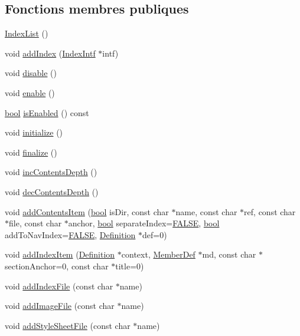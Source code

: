 \subsection*{Fonctions membres publiques}
\begin{DoxyCompactItemize}
\item 
\hyperlink{class_index_list_a9d525f0a264b6aba4f8acf2d513a31ea}{Index\+List} ()
\item 
void \hyperlink{class_index_list_a8120913e328f96fec6e5b2070902f4e7}{add\+Index} (\hyperlink{class_index_intf}{Index\+Intf} $\ast$intf)
\item 
void \hyperlink{class_index_list_ae7334e24bfdf93caf3db9d61ae62caf6}{disable} ()
\item 
void \hyperlink{class_index_list_aabffffbc2e50eeb9437640c369dfd6b7}{enable} ()
\item 
\hyperlink{qglobal_8h_a1062901a7428fdd9c7f180f5e01ea056}{bool} \hyperlink{class_index_list_a716ecb0b2b7f39d7db022d61297d9b8a}{is\+Enabled} () const 
\item 
void \hyperlink{class_index_list_a104b016afa73759d65b08f6c1cced210}{initialize} ()
\item 
void \hyperlink{class_index_list_af04e11231983acb4dbf381e809bfa178}{finalize} ()
\item 
void \hyperlink{class_index_list_ac6af95293030206c0224260e9b1d7aca}{inc\+Contents\+Depth} ()
\item 
void \hyperlink{class_index_list_a4bad65cd2fadab4529bbfe5df78cc019}{dec\+Contents\+Depth} ()
\item 
void \hyperlink{class_index_list_afac63d024f410eaf10960f240e881f0b}{add\+Contents\+Item} (\hyperlink{qglobal_8h_a1062901a7428fdd9c7f180f5e01ea056}{bool} is\+Dir, const char $\ast$name, const char $\ast$ref, const char $\ast$file, const char $\ast$anchor, \hyperlink{qglobal_8h_a1062901a7428fdd9c7f180f5e01ea056}{bool} separate\+Index=\hyperlink{qglobal_8h_a10e004b6916e78ff4ea8379be80b80cc}{F\+A\+L\+S\+E}, \hyperlink{qglobal_8h_a1062901a7428fdd9c7f180f5e01ea056}{bool} add\+To\+Nav\+Index=\hyperlink{qglobal_8h_a10e004b6916e78ff4ea8379be80b80cc}{F\+A\+L\+S\+E}, \hyperlink{class_definition}{Definition} $\ast$def=0)
\item 
void \hyperlink{class_index_list_aab8f1fb60ccd7074dfcacab6584ebaa2}{add\+Index\+Item} (\hyperlink{class_definition}{Definition} $\ast$context, \hyperlink{class_member_def}{Member\+Def} $\ast$md, const char $\ast$section\+Anchor=0, const char $\ast$title=0)
\item 
void \hyperlink{class_index_list_a847ef82be5132a43cf70e516f6c525aa}{add\+Index\+File} (const char $\ast$name)
\item 
void \hyperlink{class_index_list_aacfe4c4bf0fa41efea7015fc6aa372d6}{add\+Image\+File} (const char $\ast$name)
\item 
void \hyperlink{class_index_list_a86a377209f0483a032c4e3c241a946a9}{add\+Style\+Sheet\+File} (const char $\ast$name)
\end{DoxyCompactItemize}


